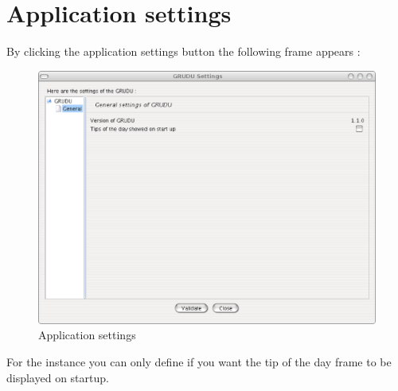 
\chapter{Application settings}
\label{chapter:application_settings}
By clicking the application settings button the following frame appears : 
\begin{figure}[H]
	\centering
	\includegraphics[width=0.6\linewidth]{figures/GRUDU_application_settings.eps}
	\caption{Application settings}
	\label{fig:GRUDU_application_settings}
\end{figure}
For the instance you can only define if you want the tip of the day frame to be
displayed on startup.

